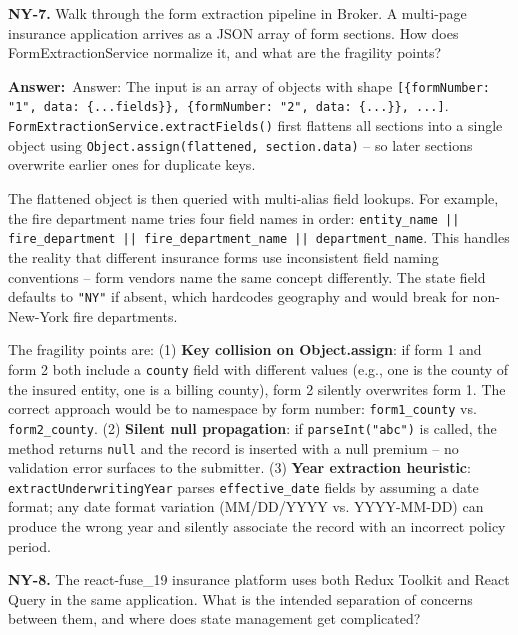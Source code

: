 \documentclass[letterpaper,10pt]{article}
\newlength{\boxwidth}
\newcommand{\answerlabel}{\noindent\textbf{\textcolor{answerblue}{Answer:}}~}
\begin{document}
\vspace{6pt}

\colorbox{qbg}{\begin{minipage}{\boxwidth}
\textbf{NY-7.} Walk through the form extraction pipeline in Broker. A multi-page insurance application arrives as a JSON array of form sections. How does FormExtractionService normalize it, and what are the fragility points?
\end{minipage}}

\vspace{2pt}
\answerlabel{Answer:} The input is an array of objects with shape \texttt{[\{formNumber: "1", data: \{...fields\}\}, \{formNumber: "2", data: \{...\}\}, ...]}. \texttt{FormExtractionService.extractFields()} first flattens all sections into a single object using \texttt{Object.assign(flattened, section.data)} -- so later sections overwrite earlier ones for duplicate keys.

The flattened object is then queried with multi-alias field lookups. For example, the fire department name tries four field names in order: \texttt{entity\_name || fire\_department || fire\_department\_name || department\_name}. This handles the reality that different insurance forms use inconsistent field naming conventions -- form vendors name the same concept differently. The state field defaults to \texttt{"NY"} if absent, which hardcodes geography and would break for non-New-York fire departments.

The fragility points are: (1) \textbf{Key collision on Object.assign}: if form 1 and form 2 both include a \texttt{county} field with different values (e.g., one is the county of the insured entity, one is a billing county), form 2 silently overwrites form 1. The correct approach would be to namespace by form number: \texttt{form1\_county} vs. \texttt{form2\_county}. (2) \textbf{Silent null propagation}: if \texttt{parseInt("abc")} is called, the method returns \texttt{null} and the record is inserted with a null premium -- no validation error surfaces to the submitter. (3) \textbf{Year extraction heuristic}: \texttt{extractUnderwritingYear} parses \texttt{effective\_date} fields by assuming a date format; any date format variation (MM/DD/YYYY vs. YYYY-MM-DD) can produce the wrong year and silently associate the record with an incorrect policy period.

\vspace{6pt}

\colorbox{qbg}{\begin{minipage}{\boxwidth}
\textbf{NY-8.} The react-fuse\_19 insurance platform uses both Redux Toolkit and React Query in the same application. What is the intended separation of concerns between them, and where does state management get complicated?
\end{minipage}}
\end{document}
